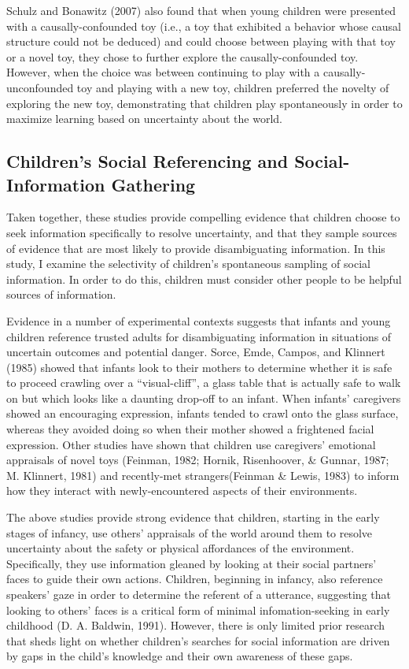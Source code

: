 \documentclass[floatsintext,man]{apa6}
\theoremstyle{definition}
\theoremstyle{definition}
\theoremstyle{definition}
\theoremstyle{remark}
\begin{document}
Schulz and Bonawitz (2007) also found that when young children were
presented with a causally-confounded toy (i.e., a toy that exhibited a
behavior whose causal structure could not be deduced) and could choose
between playing with that toy or a novel toy, they chose to further
explore the causally-confounded toy. However, when the choice was
between continuing to play with a causally-unconfounded toy and playing
with a new toy, children preferred the novelty of exploring the new toy,
demonstrating that children play spontaneously in order to maximize
learning based on uncertainty about the world.

\subsection{Children's Social Referencing and Social-Information
Gathering}\label{childrens-social-referencing-and-social-information-gathering}

Taken together, these studies provide compelling evidence that children
choose to seek information specifically to resolve uncertainty, and that
they sample sources of evidence that are most likely to provide
disambiguating information. In this study, I examine the selectivity of
children's spontaneous sampling of social information. In order to do
this, children must consider other people to be helpful sources of
information.

Evidence in a number of experimental contexts suggests that infants and
young children reference trusted adults for disambiguating information
in situations of uncertain outcomes and potential danger. Sorce, Emde,
Campos, and Klinnert (1985) showed that infants look to their mothers to
determine whether it is safe to proceed crawling over a
\enquote{visual-cliff}, a glass table that is actually safe to walk on
but which looks like a daunting drop-off to an infant. When infants'
caregivers showed an encouraging expression, infants tended to crawl
onto the glass surface, whereas they avoided doing so when their mother
showed a frightened facial expression. Other studies have shown that
children use caregivers' emotional appraisals of novel toys (Feinman,
1982; Hornik, Risenhoover, \& Gunnar, 1987; M. Klinnert, 1981) and
recently-met strangers(Feinman \& Lewis, 1983) to inform how they
interact with newly-encountered aspects of their environments.

The above studies provide strong evidence that children, starting in the
early stages of infancy, use others' appraisals of the world around them
to resolve uncertainty about the safety or physical affordances of the
environment. Specifically, they use information gleaned by looking at
their social partners' faces to guide their own actions. Children,
beginning in infancy, also reference speakers' gaze in order to
determine the referent of a utterance, suggesting that looking to
others' faces is a critical form of minimal infomation-seeking in early
childhood (D. A. Baldwin, 1991). However, there is only limited prior
research that sheds light on whether children's searches for social
information are driven by gaps in the child's knowledge and their own
awareness of these gaps.
\end{document}
